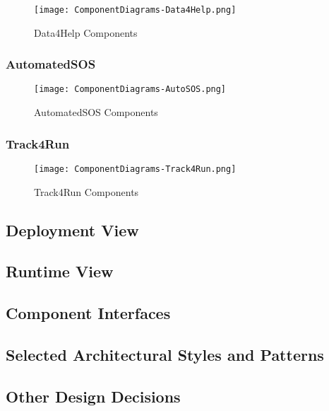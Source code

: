 \FloatBarrier
\begin{figure}[!h]
	\centering
	\texttt{[image: ComponentDiagrams-Data4Help.png]}
	\caption{Data4Help Components}
\end{figure}

\FloatBarrier

\subsubsection{AutomatedSOS}

\begin{figure}[!h]
	\centering
	\texttt{[image: ComponentDiagrams-AutoSOS.png]}
	\caption{AutomatedSOS Components}
\end{figure}

\FloatBarrier

\subsubsection{Track4Run}

\FloatBarrier
\begin{figure}[!h]
	\centering
	\texttt{[image: ComponentDiagrams-Track4Run.png]}
	\caption{Track4Run Components}
\end{figure}

\FloatBarrier


\subsection{Deployment View}
\subsection{Runtime View}
\subsection{Component Interfaces}
\subsection{Selected Architectural Styles and Patterns}
\subsection{Other Design Decisions}